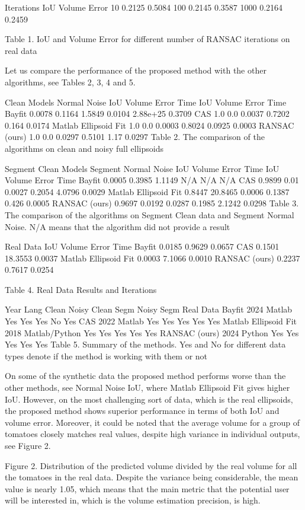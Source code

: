 Iterations	IoU	Volume Error
10	0.2125	0.5084
100	0.2145	0.3587
1000	0.2164	0.2459

Table 1. IoU and Volume Error for different number of RANSAC iterations on real data

Let us compare the performance of the proposed method with the other algorithms, see Tables 2, 3, 4 and 5.

	Clean Models	Normal Noise
	IoU	Volume Error	Time	IoU	Volume Error	Time
Bayfit	0.0078	0.1164	1.5849	0.0104	2.88e+25	0.3709
CAS	1.0	0.0	0.0037	0.7202	0.164	0.0174
Matlab Ellipsoid Fit	1.0	0.0	0.0003	0.8024	0.0925	0.0003
RANSAC (ours)	1.0	0.0	0.0297	0.5101	1.17	0.0297
Table 2. The comparison of the algorithms on clean and noisy full ellipsoids

	Segment Clean Models	Segment Normal Noise
	IoU	Volume Error	Time	IoU	Volume Error	Time
Bayfit	0.0005	0.3985	1.1149	N/A	N/A	N/A
CAS	0.9899	0.01	0.0027	0.2054	4.0796	0.0029
Matlab Ellipsoid Fit	0.8447	20.8465	0.0006	0.1387	0.426	0.0005
RANSAC (ours)	0.9697	0.0192	0.0287	0.1985	2.1242	0.0298
Table 3. The comparison of the algorithms on Segment Clean data and Segment Normal Noise. N/A means that the algorithm did not provide a result

	Real Data
	IoU	Volume Error	Time
Bayfit	0.0185	0.9629	0.0657
CAS	0.1501	18.3553	0.0037
Matlab Ellipsoid Fit	0.0003	7.1066	0.0010
RANSAC (ours)	0.2237	0.7617	0.0254

Table 4. Real Data Results and Iterations


	Year	Lang	Clean	Noisy	Clean Segm	Noisy Segm	Real Data
Bayfit	2024	Matlab	Yes	Yes	Yes	No	Yes
CAS	2022	Matlab	Yes	Yes	Yes	Yes	Yes
Matlab Ellipsoid Fit	2018	Matlab/Python	Yes	Yes	Yes	Yes	Yes
RANSAC (ours)	2024	Python	Yes	Yes	Yes	Yes	Yes
Table 5. Summary of the methods. Yes and No for different data types denote if the method is working with them or not

On some of the synthetic data the proposed method performs worse than the other methods, see Normal Noise IoU, where Matlab Ellipsoid Fit gives higher IoU. However, on the most challenging sort of data, which is the real ellipsoids, the proposed method shows superior performance in terms of both IoU and volume error. Moreover, it could be noted that the average volume for a group of tomatoes closely matches real values, despite high variance in individual outputs, see Figure 2.

Figure 2.  Distribution of the predicted volume divided by the real
volume for all the tomatoes in the real data. Despite the variance
being considerable, the mean value is nearly 1.05, which means
that the main metric that the potential user will be interested in,
which is the volume estimation precision, is high.

